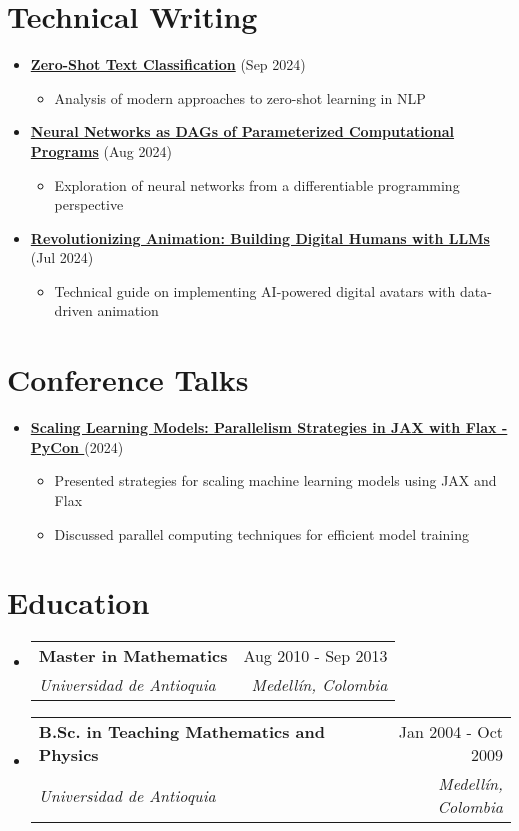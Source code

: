 \documentclass[letterpaper,11pt]{article}
\makeatletter
\newcommand{\resumeSubheading}[4]{
  \vspace{-2pt}
  \item[]
  \begin{tabular*}{\textwidth}{@{\extracolsep{\fill}}l r}
    \textbf{#1} & #2 \\
    \textit{#3} & \textit{#4} \\
  \end{tabular*}
  \vspace{-5pt}
}
\newcommand{\normalfaYoutube}{{\mdseries\faYoutube}}
\makeatother
\begin{document}
\section{Technical Writing}
\begin{itemize}[leftmargin=*]
    \item \textbf{\href{https://www.asanchezyali.com/blog/en/ai/20240917ZeroShot}{Zero-Shot Text Classification}} (Sep 2024)
    \begin{itemize}
        \item Analysis of modern approaches to zero-shot learning in NLP
    \end{itemize} 
    
    \item \textbf{\href{https://www.asanchezyali.com/blog/en/differentiable-programming/20240923DifferentiablePrograms}{Neural Networks as DAGs of Parameterized Computational Programs}} (Aug 2024)
    \begin{itemize}
        \item Exploration of neural networks from a differentiable programming perspective
    \end{itemize}
    
    \item \textbf{\href{https://www.asanchezyali.com/blog/en/ai-avatars/20240703DigitalHuman}{Revolutionizing Animation: Building Digital Humans with LLMs}} (Jul 2024)
    \begin{itemize}
        \item Technical guide on implementing AI-powered digital avatars with data-driven animation
    \end{itemize}
\end{itemize}

\section{Conference Talks}
\begin{itemize}[leftmargin=*]
    \item \textbf{\href{https://www.youtube.com/watch?v=m4hP1soE414}{Scaling Learning Models: Parallelism Strategies in JAX with Flax - PyCon \normalfaYoutube}} (2024)
    \begin{itemize}
        \item Presented strategies for scaling machine learning models using JAX and Flax
        \item Discussed parallel computing techniques for efficient model training
    \end{itemize}
\end{itemize}

\section{Education}
\begin{itemize}[leftmargin=0pt, itemindent=0pt, label={}]
\resumeSubheading
{Master in Mathematics}{Aug 2010 - Sep 2013}
{Universidad de Antioquia}{Medellín, Colombia}

\resumeSubheading
{B.Sc. in Teaching Mathematics and Physics}{Jan 2004 - Oct 2009}
{Universidad de Antioquia}{Medellín, Colombia}
\end{itemize}
\end{document}
